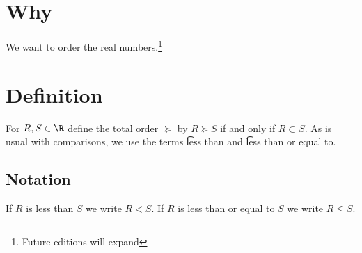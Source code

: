 

\section*{Why}

We want to order the real numbers.\footnote{Future editions will expand}

\section*{Definition}

For $R, S \in \R $ define the total order $\succeq$ by $R \succeq S$ if and only if $R \subset S$.
As is usual with comparisons, we use the terms \t{less than} and \t{less than or equal to}.


\subsection*{Notation}

If $R$ is less than $S$ we write $R < S$.
If $R$ is less than or equal to $S$ we write $R \leq S$.

\blankpage